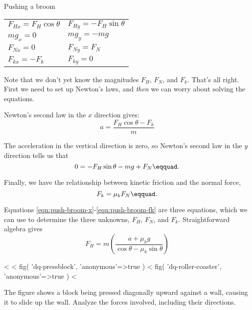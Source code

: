 \begin{eg}{Pushing a broom}
\begin{tabular}{ll}
$F_{Hx}=F_H\cos\theta$ & $F_{Hy}=-F_H\sin\theta$ \\
$mg_x = 0$ & $mg_y = -mg$ \\
$F_{Nx} = 0$ & $F_{Ny} = F_N$ \\
$F_{kx} = -F_k$ & $F_{ky} = 0$
\end{tabular}

\noindent Note that we don't yet know the magnitudes $F_H$, $F_N$, and $F_k$. That's all right. First we need to set up
Newton's laws, and \emph{then} we can worry about solving the equations.

Newton's second law in the $x$ direction gives:
\begin{equation}\label{eqn:push-broom-x}
  a = \frac{F_H\cos\theta-F_k}{m}
\end{equation}

The acceleration in the vertical direction is zero, so Newton's second law in the $y$ direction tells us that
\begin{equation}\label{eqn:push-broom-y}
  0 = -F_H\sin\theta-mg+F_N\eqquad.
\end{equation}

Finally, we have the relationship between kinetic friction and the normal force,
\begin{equation}\label{eqn:push-broom-fk}
  F_k = \mu_k F_N\eqquad.
\end{equation}

Equations \eqref{eqn:push-broom-x}-\eqref{eqn:push-broom-fk} are three equations, which we can use to determine
the three unknowns, $F_H$, $F_N$, and $F_k$. Straightforward algebra gives
\begin{equation*}
  F_H = m \left(\frac{a+\mu_k g}{\cos\theta-\mu_k\sin\theta}\right)
\end{equation*}
\end{eg}


\startdqs

<%
<%
  fig(
    'dq-pressblock',
    {
      'anonymous'=>true
    }
  )
\spacebetweenfigs
<%
  fig(
    'dq-roller-coaster',
    {
      'anonymous'=>true
    }
  )
<%
\begin{dq}\label{dq:pressblock}
The figure shows a block being pressed diagonally upward
against a wall, causing it to slide up the wall. Analyze the
forces involved, including their directions.
\end{dq}

